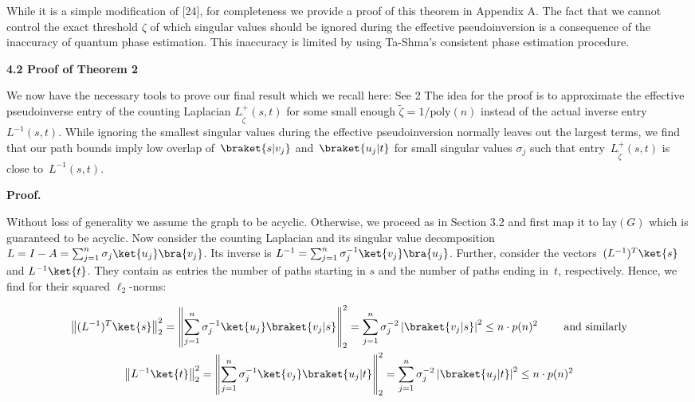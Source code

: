 


While it is a simple modification of [24], for completeness we provide a proof of this theorem in Appendix A.
The fact that we cannot control the exact threshold $\zeta$ of which singular values should be ignored during the effective pseudoinversion is a consequence of the inaccuracy of quantum phase estimation. This inaccuracy is limited by using Ta-Shma’s consistent phase estimation procedure.\par





\par\medskip\noindent\textbf{
4.2 Proof of Theorem 2}\par




We now have the necessary tools to prove our final result which we recall here:
See 2
The idea for the proof is to approximate the effective pseudoinverse entry of the counting Laplacian $L^{+}_{\tilde{\zeta}}(s,t)$ for some small enough $\tilde{\zeta}=1/\mathrm{poly}(n)$ instead of the actual inverse entry $L^{-1}(s,t)$.
While ignoring the smallest singular values during the effective pseudoinversion normally leaves out the largest terms, we find that our path bounds imply low overlap of $\braket{s|v_{j}}$ and $\braket{u_{j}|t}$ for small singular values $\sigma_{j}$ such that entry $L^{+}_{\tilde{\zeta}}(s,t)$ is close to $L^{-1}(s,t)$.\par




\par\medskip\noindent\textbf{Proof.}\par




Without loss of generality we assume the graph to be acyclic. Otherwise, we proceed as in Section 3.2 and first map it to $\mathrm{lay}(G)$ which is guaranteed to be acyclic.
Now consider the counting Laplacian and its singular value decomposition $L=I-A=\sum_{j=1}^{n}\sigma_{j}\ket{u_{j}}\bra{v_{j}}$. Its inverse is $L^{-1}=\sum_{j=1}^{n}\sigma_{j}^{-1}\ket{v_{j}}\bra{u_{j}}$.
Further, consider the vectors $(L^{-1})^{T}\ket{s}$ and $L^{-1}\ket{t}$.
They contain as entries the number of paths starting in $s$ and the number of paths ending in $t$, respectively. Hence, we find for their squared $\ell_{2}$-norms:\par


\[\begin{gathered}
\displaystyle\left\|(L^{-1})^{T}\ket{s}\right\|_{2}^{2} \displaystyle=\left\|\sum_{j=1}^{n}\sigma_{j}^{-1}\ket{u_{j}}\braket{v_{j}|s}\right\|_{2}^{2}=\sum_{j=1}^{n}\sigma_{j}^{-2}\left|\braket{v_{j}|s}\right|^{2}\leq n\cdot p(n)^{2}\qquad\text{ and similarly} \\
\displaystyle\left\|L^{-1}\ket{t}\right\|_{2}^{2} \displaystyle=\left\|\sum_{j=1}^{n}\sigma_{j}^{-1}\ket{v_{j}}\braket{u_{j}|t}\right\|_{2}^{2}=\sum_{j=1}^{n}\sigma_{j}^{-2}\left|\braket{u_{j}|t}\right|^{2}\leq n\cdot p(n)^{2}
\end{gathered}\]


